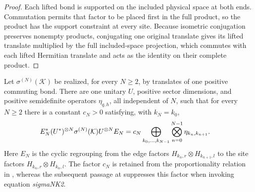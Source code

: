 \begin{proof}\leanok
    Each lifted bond is supported on the included physical space at
    both ends. Commutation permits that factor to be placed first in
    the full product, so the product has the support constraint at
    every site. Because isometric conjugation preserves nonempty products,
    conjugating one original translate gives its lifted translate
    multiplied by the full included-space projection, which
    commutes with each lifted Hermitian translate and acts as the
    identity on their complete product.
\end{proof}

\begin{lemma}
    \label{thm:mpdo_eta_local_sigma_nk2}
    \leanok
    Let $\sigma^{(N)}(\mathcal K)$ be realized, for every $N\ge2$, by
    translates of one positive commuting bond. There are one unitary $U$,
    positive sector dimensions, and positive semidefinite operators
    $\eta_{q,h}$, all independent of $N$, such that for every $N\ge2$ there
    is a constant $c_N>0$ satisfying, with $k_N=k_0$,
    \begin{align}
        E_N^*(U^*)^{\otimes N}\sigma^{(N)}(\mathcal K)
        U^{\otimes N}E_N
         & =
        c_N\bigoplus_{k_0,\ldots,k_{N-1}}
        \bigotimes_{n=0}^{N-1}\eta_{k_n,k_{n+1}}.
        \notag
    \end{align}
    Here $E_N$ is the cyclic regrouping from the edge factors
    $H_{k_n,r}\otimes H_{k_{n+1},l}$ to the site factors
    $H_{k_n,r}\otimes H_{k_n,l}$. The factor $c_N$ is retained from the
    proportionality relation in
    \cite[Appendix~C.2, lines~1571--1576]{Cirac2016MPDO_arXiv}, whereas the
    subsequent passage at
    \cite[Appendix~C.2, lines~1603--1605]{Cirac2016MPDO_arXiv} suppresses this
    factor when invoking equation \emph{sigmaNK2}.
\end{lemma}

